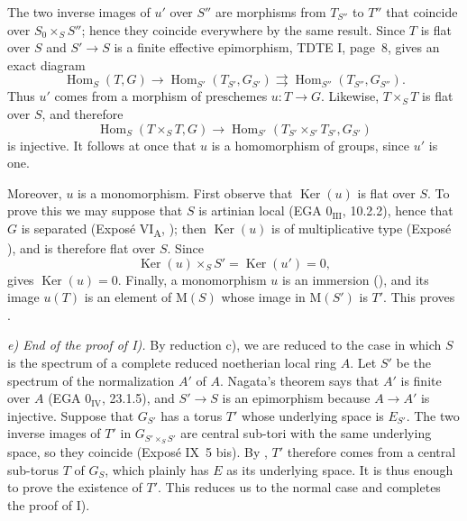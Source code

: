 The two inverse images of \(u'\) over \(S''\) are morphisms from
\(T_{S''}\) to \(T''\) that coincide over \(S_0\times_S S''\);
hence they coincide everywhere by the same result. Since \(T\) is
flat over \(S\) and \(S'\to S\) is a finite effective
epimorphism, TDTE I, page~8, gives an exact diagram
\[
  \operatorname{Hom}_S(T,G)\longrightarrow
  \operatorname{Hom}_{S'}(T_{S'},G_{S'})
  \rightrightarrows
  \operatorname{Hom}_{S''}(T_{S''},G_{S''}).
\]
Thus \(u'\) comes from a morphism of preschemes \(u:T\to G\).
Likewise, \(T\times_S T\) is flat over \(S\), and therefore
\[
  \operatorname{Hom}_S(T\times_S T,G)\longrightarrow
  \operatorname{Hom}_{S'}(T_{S'}\times_{S'}T_{S'},G_{S'})
\]
is injective. It follows at once that \(u\) is a homomorphism of
groups, since \(u'\) is one.

Moreover, \(u\) is a monomorphism. First observe that
\(\operatorname{Ker}(u)\) is flat over \(S\). To prove this we may
suppose that \(S\) is artinian local (EGA
\(0_{\mathrm{III}}\), 10.2.2), hence that \(G\) is separated
(Exposé VI\textsubscript{A}, ); then
\(\operatorname{Ker}(u)\) is of multiplicative type (Exposé
), and is therefore flat over \(S\). Since
\[
  \operatorname{Ker}(u)\times_S S'
    =\operatorname{Ker}(u')=0,
\]
 gives \(\operatorname{Ker}(u)=0\). Finally, a
monomorphism \(u\) is an immersion (),
and its image \(u(T)\) is an element of \(\mathrm M(S)\) whose
image in \(\mathrm M(S')\) is \(T'\). This proves .

\smallskip
\noindent\textit{e) End of the proof of I).}\quad
By reduction c), we are reduced to the case in which \(S\) is the
spectrum of a complete reduced noetherian local ring \(A\). Let
\(S'\) be the spectrum of the normalization \(A'\) of \(A\).
Nagata's theorem says that \(A'\) is finite over \(A\) (EGA
\(0_{\mathrm{IV}}\), 23.1.5), and \(S'\to S\) is an epimorphism
because \(A\to A'\) is injective. Suppose that \(G_{S'}\) has a
torus \(T'\) whose underlying space is \(E_{S'}\). The two inverse
images of \(T'\) in \(G_{S'\times_S S'}\) are central sub-tori
with the same underlying space, so they coincide (Exposé IX~5
bis). By , \(T'\) therefore comes from a central
sub-torus \(T\) of \(G_S\), which plainly has \(E\) as its
underlying space. It is thus enough to prove the existence of
\(T'\). This reduces us to the normal case and completes the proof
of I).

